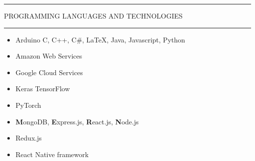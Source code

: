 \documentclass{article}
\newcommand{\makesection}[1]{\hrule\vskip1mm\uppercase{#1}\vskip1mm\hrule}
\begin{document}
    \makesection{Programming Languages and Technologies}
    \vspace*{-2mm}
    \begin{multicols}{2}\begin{itemize}[leftmargin=.35cm]
        \setlength\itemsep{0cm}
        \item Arduino C, C++, C\#, \LaTeX, Java, Javascript, Python
        \item Amazon Web Services
        \item Google Cloud Services
        \item Keras TensorFlow
        \item PyTorch
        \item \textbf{M}ongoDB, \textbf{E}xpress.js, \textbf{R}eact.js, \textbf{N}ode.js
        \item Redux.js
        \item React Native framework
    \end{itemize}\end{multicols}
\end{document}
